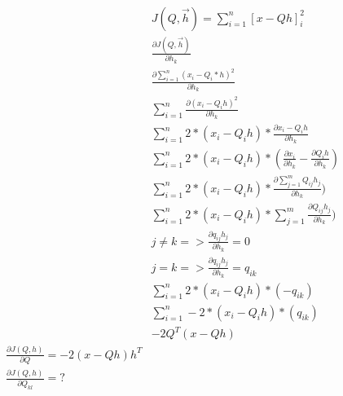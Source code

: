 \documentclass[10pt,a4paper]{report}
\begin{document}
\paragraph{}
\begin{align}
&J(Q,\vec{h}) = \sum_{i=1}^n [x-Qh]_i^2\\
&\frac{\partial J(Q, \vec{h})}{\partial h_k}\\
&\frac{\partial \sum_{i=1}^n (x_i - Q_i*h)^2}{\partial h_k} \\
&\sum_{i=1}^n \frac{\partial (x_i - Q_ih)^2}{\partial h_k} \\
&\sum_{i=1}^n 2*(x_i - Q_ih)*\frac{\partial x_i - Q_ih}{\partial h_k} \\
&\sum_{i=1}^n 2*(x_i - Q_ih)*(\frac{\partial x_i}{\partial h_k} -\frac{\partial Q_ih}{\partial h_k}) \\
&\sum_{i=1}^n 2*(x_i - Q_ih)*\frac{\partial \sum_{j=1}^m Q_{ij}h_j} {\partial h_k}) \\
&\sum_{i=1}^n 2*(x_i - Q_ih)*\sum_{j=1}^m \frac{\partial  Q_{ij}h_j} {\partial h_k}) \\
&j\neq k => \frac{\partial  q_{ij}h_j} {\partial h_k} = 0\\
&j = k => \frac{\partial  q_{ij}h_j} {\partial h_k} = q_{ik}\\
&\sum_{i=1}^n 2*(x_i - Q_ih)*(-q_{ik}) \\
&\sum_{i=1}^n -2*(x_i - Q_ih)*(q_{ik}) \\
&-2Q^T(x-Qh)\\
\frac{\partial J(Q,h)}{\partial Q} = -2(x-Qh)h^T\\
\frac{\partial J(Q,h)}{\partial Q_{kl}} = ?\\
\end{align}
\end{document}

